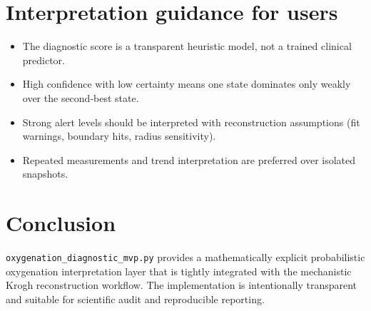 \documentclass[12pt,a4paper]{article}
\begin{document}
\section{Interpretation guidance for users}
\begin{itemize}
    \item The diagnostic score is a transparent heuristic model, not a trained clinical predictor.
    \item High confidence with low certainty means one state dominates only weakly over the second-best state.
    \item Strong alert levels should be interpreted with reconstruction assumptions (fit warnings, boundary hits, radius sensitivity).
    \item Repeated measurements and trend interpretation are preferred over isolated snapshots.
\end{itemize}

\section{Conclusion}
\texttt{oxygenation\_diagnostic\_mvp.py} provides a mathematically explicit probabilistic oxygenation interpretation layer that is tightly integrated with the mechanistic Krogh reconstruction workflow. The implementation is intentionally transparent and suitable for scientific audit and reproducible reporting.
\end{document}
